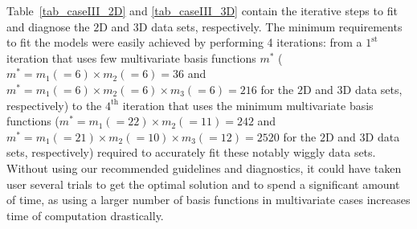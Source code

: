 Table~\ref{tab_caseIII_2D} and \ref{tab_caseIII_3D} contain the iterative steps to fit and diagnose the $2$D and $3$D data sets, respectively. 
The minimum requirements to fit the models were easily achieved by performing 4 iterations: from a $1^{\text{st}}$ iteration that uses few multivariate basis functions $m^*$ ($m^*=m_1(=6) \times m_2(=6)=36$ and $m^*=m_1(=6) \times m_2(=6) \times m_3(=6)=216$ for the $2$D and $3$D data sets, respectively) to the $4^{\text{th}}$ iteration that uses the minimum multivariate basis functions ($m^*=m_1(=22) \times m_2(=11)=242$ and $m^*=m_1(=21) \times m_2(=10) \times m_3(=12)=2520$ for the $2$D and $3$D data sets, respectively) required to accurately fit these notably wiggly data sets. Without using our recommended guidelines and diagnostics, it could have taken user several trials to get the optimal solution and to spend a significant amount of time, as using a larger number of basis functions in multivariate cases increases time of computation drastically.

